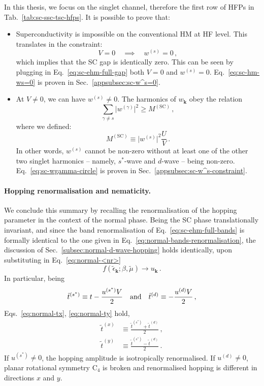 In this thesis, we focus on the singlet channel, therefore the first row of HFPs in Tab.~\ref{tab:sc-ssc-tsc-hfps}. It is possible to prove that:
\begin{itemize}
	\item Superconductivity is impossible on the conventional HM at HF level. This translates in the constraint:
	\begin{equation}\label{eq:sc-hm-ws=0}
		V=0
		\quad\implies\quad
		w^{(s)} = 0 \, ,
	\end{equation}
	which implies that the SC gap is identically zero. This can be seen by plugging in Eq.~\eqref{eq:sc-ehm-full-gap} both $V=0$ and $w^{(s)}=0$. Eq.~\eqref{eq:sc-hm-ws=0} is proven in Sec.~\ref{appsubsec:sc-w^s=0}.
	\item At $V \neq 0$, we can have $w^{(s)} \neq 0$. The harmonics of $w_\mathbf{k}$ obey the relation
	\begin{equation}\label{eq:sc-wgamma-circle}
		\sum_{\gamma \neq s} \big| w^{(\gamma)} \big|^2 \ge M^{(\mathrm{SC})} \, ,
	\end{equation}
	where we defined:
	\[
		M^{(\mathrm{SC})} \equiv \big| w^{(s)} \big|^2 \frac U V \, .
	\]
	In other words, $w^{(s)}$ cannot be non-zero without at least one of the other two singlet harmonics -- namely, $s^*$-wave and $d$-wave -- being non-zero. Eq.~\eqref{eq:sc-wgamma-circle} is proven in Sec.~\ref{appsubsec:sc-w^s-constraint}.
\end{itemize}

\paragraph{Hopping renormalisation and nematicity.}

We conclude this summary by recalling the renormalisation of the hopping parameter in the context of the normal phase. Being the SC phase translationally invariant, and since the band renormalisation of Eq.~\eqref{eq:sc-ehm-full-bands} is formally identical to the one given in Eq.~\eqref{eq:normal-bands-renormalisation}, the discussion of Sec.~\ref{subsec:normal-d-wave-hopping} holds identically, upon substituting in Eq.~\eqref{eq:normal-<nr>}
\[
	f(\tilde{\epsilon}_\mathbf{k};\beta,\tilde{\mu}) \to u_\mathbf{k} \, .
\]
In particular, being
\begin{equation}\label{eq:sc-tS-td}
	\tilde{t}^{(s^*)} \equiv t - \frac{u^{(s^*)} V}{2}
	\qq{and}
	\tilde{t}^{(d)} \equiv - \frac{u^{(d)} V}{2} \, ,
\end{equation}
Eqs.~\eqref{eq:normal-tx}, \eqref{eq:normal-ty} hold,
\begin{align}
	\tilde{t}^{(x)} &\equiv \frac{\tilde{t}^{(s^*)} + \tilde{t}^{(d)}}{2} \, , \label{eq:sc-tx} \\
	\tilde{t}^{(y)} &\equiv \frac{\tilde{t}^{(s^*)} - \tilde{t}^{(d)}}{2} \, . \label{eq:sc-ty}
\end{align}
If $u^{(s^*)} \neq 0$, the hopping amplitude is isotropically renormalised. If $u^{(d)} \neq 0$, planar rotational symmetry $\mathrm{C}_4$ is broken and renormalised hopping is different in directions $x$ and $y$.


